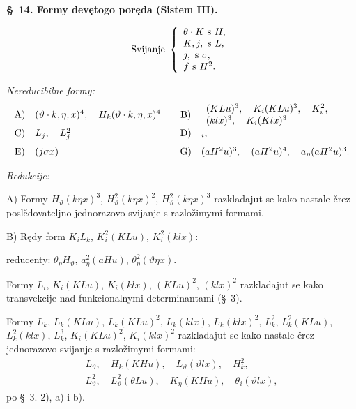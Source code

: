 \documentclass[11pt]{article}
\let\A\relax
\newcommand{\A}{\mathfrak A}
\begin{document}
\begin{center}
\textbf{\S\ 14. \quad Formy devętogo poręda (Sistem III).}
\end{center}
\[
\text{Svijanje }\left\{\begin{array}{l}
\theta\cdot K \text{ s }H,\\
K,j,\A \text{ s }L,\\
j,\A \text{ s }\sigma,\\
f \text{ s }H^2.
\end{array}\right.
\]

\noindent\textit{Nereducibilne formy:}
\[
\begin{array}{c@{\quad}l@{\qquad}c@{\quad}l}
\mathrm{A)}&(\vartheta\cdot k,\eta,x)^4,\quad
H_k(\vartheta\cdot k,\eta,x)^4&
\mathrm{B)}&\begin{array}{l}
(KLu)^3,\quad K_i(KLu)^3,\quad K_i^2,\\
(klx)^3,\quad K_i(Klx)^3
\end{array}\\[0.7em]
\mathrm{C)}&L_j,\quad L_j^2&
\mathrm{D)}&\A_i,\\[0.7em]
\mathrm{E)}&(j\sigma x)&
\mathrm{G)}&(aH^2u)^3,\quad (aH^2u)^4,\quad a_\eta(aH^2u)^3.
\end{array}
\]

\noindent\textit{Redukcije:}

\noindent\mbox{A)} Formy $H_\vartheta(k\eta x)^3$, $H_\vartheta^2(k\eta x)^2$, $H_\vartheta^2(k\eta x)^3$ razkladajut se kako nastale črez poslědovateljno jednorazovo svijanje s razložimymi formami.

\noindent\mbox{B)} Rędy form $K_iL_k$, $K_i^2(KLu)$, $K_i^2(klx)$:

reducenty: $\theta_\eta H_\vartheta$, $a_\eta^2(aHu)$, $\theta_\eta^2(\vartheta\eta x)$.

Formy $L_i$, $K_i(KLu)$, $K_i(klx)$, $(KLu)^2$, $(klx)^2$ razkladajut se kako transvekcije nad funkcionalnymi determinantami (\S\ 3).

Formy $L_k$, $L_k(KLu)$, $L_k(KLu)^2$, $L_k(klx)$, $L_k(klx)^2$, $L_k^2$, $L_k^2(KLu)$, $L_k^2(klx)$, $L_k^3$, $K_i(KLu)^2$, $K_i(klx)^2$ razkladajut se kako nastale črez jednorazovo svijanje s razložimymi formami:
\[
\begin{gathered}
L_\vartheta,\quad H_k(KHu),\quad L_\vartheta(\vartheta lx),\quad H_k^2,\\
L_\vartheta^2,\quad L_\vartheta^2(\theta Lu),\quad
K_\eta(KHu),\quad \theta_i(\vartheta lx),
\end{gathered}
\]
po \S\ 3. 2), \mbox{a)} i \mbox{b)}.
\end{document}
